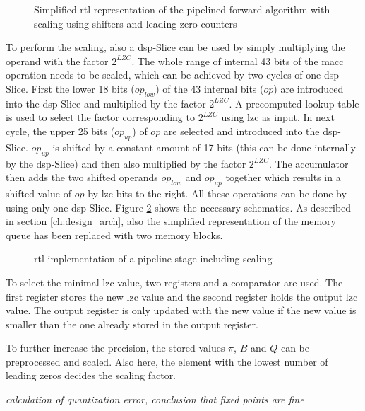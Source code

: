 \documentclass[mscthesis]{usiinfthesis}
\begin{document}
\begin{figure}
    \centering
    
    \caption{Simplified \acrshort{rtl} representation of the pipelined forward algorithm
        with scaling using shifters and leading zero counters}
    \label{fig:arch_pipe_scale}
\end{figure}

To perform the scaling, also a \gls{dsp}-Slice can be used by simply
multiplying the operand with the factor $2^{LZC}$. The whole range of internal
43 bits of the \gls{macc} operation needs to be scaled, which can be achieved
by two cycles of one \gls{dsp}-Slice. First the lower 18 bits ($op_{low}$) of
the 43 internal bits ($op$) are introduced into the \gls{dsp}-Slice and
multiplied by the factor $2^{LZC}$.  A precomputed lookup table is used to
select the factor corresponding to $2^{LZC}$ using \gls{lzc} as input. In next
cycle, the upper 25 bits ($op_{up}$) of $op$ are selected and introduced into
the \gls{dsp}-Slice. $op_{up}$ is shifted by a constant amount of 17 bits (this
can be done internally by the \gls{dsp}-Slice) and then also multiplied by the
factor $2^{LZC}$. The accumulator then adds the two shifted operands $op_{low}$
and $op_{up}$ together which results in a shifted value of $op$ by \gls{lzc}
bits to the right. All these operations can be done by using only one
\gls{dsp}-Slice. Figure \ref{fig:arch_step_scale} shows the necessary
schematics. As described in section \ref{ch:design_arch}, also the simplified
representation of the memory queue has been replaced with two memory blocks.

\begin{figure}
    \centering
    
    \caption{\acrshort{rtl} implementation of a pipeline stage including scaling}
    \label{fig:arch_step_scale}
\end{figure}

To select the minimal \gls{lzc} value, two registers and a comparator are used. The
first register stores the new \gls{lzc} value and the second register holds the output
\gls{lzc} value. The output register is only updated with the new value if the new
value is smaller than the one already stored in the output register.

To further increase the precision, the stored values $\pi$, $B$ and $Q$ can be
preprocessed and scaled. Also here, the element with the lowest number of
leading zeros decides the scaling factor.

\emph{\color{red}calculation of quantization error, conclusion that fixed points
are fine}
\end{document}
